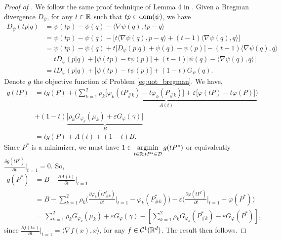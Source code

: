 \begin{proof}[Proof of ]
We follow the same proof technique of Lemma 4 in \citep{Khiem20}.
Given a Bregman divergence $D_{\psi}$, for any $t \in \mathbb R$ such that $tp \in \text{dom}(\psi)$,
we have
\begin{align}
  D_{\psi}(t p | q)
  &= \psi(tp) - \psi(q) - \langle \nabla \psi(q), tp - q \rangle \\
  &= \psi(tp) - \psi(q) - \Big[
    t \langle \nabla \psi(q), p - q \rangle + (t-1) \langle \nabla \psi(q), q \rangle
  \Big] \\
  &= \psi(tp) - \psi(q) + t \Big[ D_{\psi}(p | q) + \psi(q) - \psi(p) \Big]
  - (t-1) \langle \nabla \psi(q), q \rangle \\
  &= t D_{\psi}(p | q) + \big[ \psi(tp) - t \psi(p) \big]
  + (t-1) \big[ \psi(q) - \langle \nabla \psi(q), q \rangle \big] \\
  &= t D_{\psi}(p | q) + \big[ \psi(tp) - t \psi(p) \big] + (1 - t) G_{\psi}(q).
\end{align}
Denote $g$ the objective function of Problem \eqref{eq:uot_bregman}. We have,
\begin{align}
  g(tP) &= t g(P) +
  \underbrace{\Big( \sum_{k=1}^2 \rho_k \big[ \varphi_k(tP_{\# k}) - t \varphi_k(P_{\# k}) \big]
  + \varepsilon \big[ \varphi(tP) - t \varphi(P) \big] \Big)}_{A(t)} \\
  &+ (1 - t) \underbrace{\big[ \rho_k G_{\varphi_k}(\mu_k) + \varepsilon G_{\varphi}(\gamma) \big]}_{B} \\
    &= t g(P) + A(t) + (1 - t) B.
\end{align}
Since $P^*$ is a minimizer, we must have $1 \in \operatorname*{argmin}\limits_{t \in \mathbb R: tP^* \in \mathcal D} g(tP^*)$
or equivalently $\frac{\partial g(tP^*)}{\partial t} \Big |_{t = 1} = 0$. So,
\begin{align}
  g(P^*) &= B - \frac{\partial A(t)}{\partial t} \bigg|_{t=1} \\
  &= B - \sum_{k=1}^2
  \rho_k \Bigg( \frac{\partial \varphi_k(tP^*_{\# k})}{\partial t} \bigg|_{t=1} - \varphi_k(P^*_{\# k}) \Bigg)
  - \varepsilon \Bigg( \frac{\partial \varphi(tP^*)}{\partial t} \bigg|_{t=1} - \varphi(P^*) \Bigg) \\
  &= \sum_{k=1}^2 \rho_k G_{\varphi_k}(\mu_k) + \varepsilon G_{\varphi}(\gamma)
- \left[ \sum_{k=1}^2 \rho_k G_{\varphi_k}(P^*_{\# k}) - \varepsilon G_{\varphi}(P^*) \right],
\end{align}
since $\frac{\partial f(tx)}{ \partial t} \Big |_{t=1} = \langle \nabla f(x), x \rangle$,
for any $f \in \mathcal C^1(\mathbb R^d)$. The result then follows.
\end{proof}

